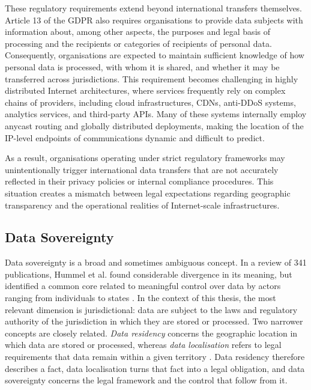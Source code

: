 These regulatory requirements extend beyond international transfers themselves. Article 13 of the GDPR also requires organisations to provide data subjects with information about, among other aspects, the purposes and legal basis of processing and the recipients or categories of recipients of personal data. Consequently, organisations are expected to maintain sufficient knowledge of how personal data is processed, with whom it is shared, and whether it may be transferred across jurisdictions. This requirement becomes challenging in highly distributed Internet architectures, where services frequently rely on complex chains of providers, including cloud infrastructures, CDNs, anti-DDoS systems, analytics services, and third-party APIs. Many of these systems internally employ anycast routing and globally distributed deployments, making the location of the IP-level endpoints of communications dynamic and difficult to predict.

As a result, organisations operating under strict regulatory frameworks may unintentionally trigger international data transfers that are not accurately reflected in their privacy policies or internal compliance procedures. This situation creates a mismatch between legal expectations regarding geographic transparency and the operational realities of Internet-scale infrastructures.

\subsection{Data Sovereignty}
\label{sc:background_privacy_data_sovereignty}

Data sovereignty is a broad and sometimes ambiguous concept. In a review of 341 publications, Hummel et al. found considerable divergence in its meaning, but identified a common core related to meaningful control over data by actors ranging from individuals to states \cite{Hummel2021DataReview}. In the context of this thesis, the most relevant dimension is jurisdictional: data are subject to the laws and regulatory authority of the jurisdiction in which they are stored or processed. Two narrower concepts are closely related. \textit{Data residency} concerns the geographic location in which data are stored or processed, whereas \textit{data localisation} refers to legal requirements that data remain within a given territory \cite{Chander2015DataNationalism}. Data residency therefore describes a fact, data localisation turns that fact into a legal obligation, and data sovereignty concerns the legal framework and the control that follow from it.


